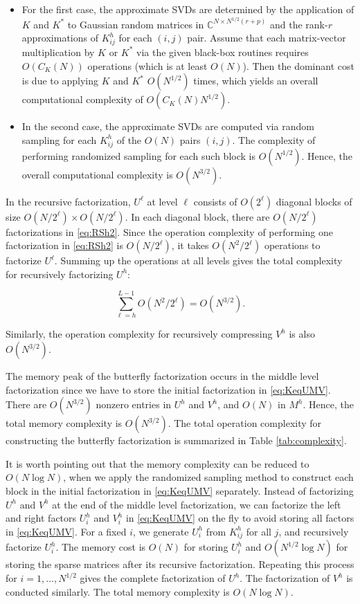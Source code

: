 \begin{itemize}
\item For the first case, the approximate SVDs are determined by the application of $K$ and $K^*$ to Gaussian random matrices in
  $\mathbb{C}^{N\times N^{1/2}(r+p)}$ and the rank-$r$ approximations of $K^h_{ij}$ for each $(i,j)$ pair.  Assume that each matrix-vector multiplication by $K$ or $K^*$ via the given black-box routines requires $O(C_K(N))$ operations (which is at least $O(N)$).  Then the dominant cost is due to applying $K$ and $K^*$ $O(N^{1/2})$ times, which yields an overall computational complexity of $O(C_K(N)N^{1/2})$.
\item In the second case, the approximate SVDs are computed via random sampling for each $K^h_{ij}$ of the $O(N)$ pairs $(i,j)$. The complexity of performing randomized sampling for each such block is $O(N^{1/2})$.  Hence, the overall computational complexity is $O(N^{3/2})$.
\end{itemize}

In the recursive factorization, $U^{\ell}$ at level $\ell$ consists of
$O(2^{\ell})$ diagonal blocks of size $O(N/2^{\ell})\times O(
N/2^{\ell})$.  In each diagonal block, there are $O(N/2^{\ell})$
factorizations in \eqref{eq:RSh2}.  Since the operation complexity of performing one factorization in \eqref{eq:RSh2} is $O (N /
2^{\ell})$, it takes $O(N^{2} / 2^{\ell})$ operations to factorize
$U^{\ell}$.  Summing up the operations at all levels gives the total complexity for recursively factorizing $U^h$:

\begin{equation}\label{eq:complexityU}
\sum^{L-1}_{\ell=h}O(N^{2}/2^{\ell})
= O(N^{3/2}).
\end{equation}

Similarly, the operation complexity for recursively compressing $V^h$ is also $O(N^{3/2})$.

The memory peak of the butterfly factorization occurs in the middle level factorization since we have to store the initial factorization in \eqref{eq:KeqUMV}.  There are $O(N^{3/2})$ nonzero entries in $U^h$ and $V^h$, and $O(N)$ in $M^h$.  Hence, the total memory complexity is $O(N^{3/2})$. The total operation complexity for constructing the butterfly factorization is summarized in Table
\ref{tab:complexity}.

It is worth pointing out that the memory complexity can be reduced to
$O(N\log N)$, when we apply the randomized sampling method to construct each block in the initial factorization in \eqref{eq:KeqUMV}
separately.  Instead of factorizing $U^h$ and $V^h$ at the end of the middle level factorization, we can factorize the left and right factors $U^h_i$ and $V^h_i$ in \eqref{eq:KeqUMV} on the fly to avoid storing all factors in \eqref{eq:KeqUMV}.  For a fixed $i$, we generate $U^h_{i}$ from $K^h_{ij}$ for all $j$, and recursively factorize $U^h_{i}$.  The memory cost is $O(N)$ for storing $U^h_{i}$ and $O(N^{1/2}\log N)$ for storing the sparse matrices after its recursive factorization.  Repeating this process for $i = 1, \dots,
N^{1/2}$ gives the complete factorization of $U^h$.  The factorization of $V^h$ is conducted similarly.  The total memory complexity is
$O(N\log N)$.

